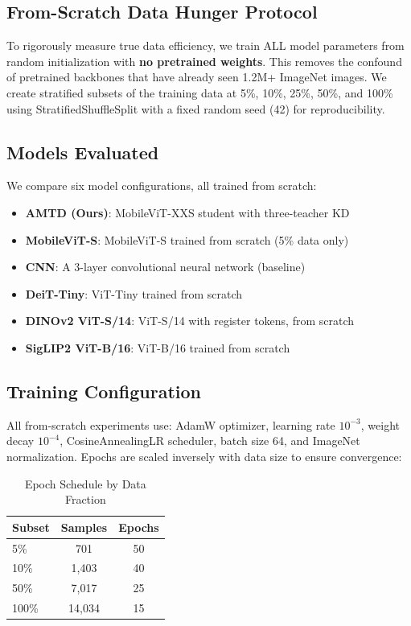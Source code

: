 \documentclass[journal]{IEEEtran}
\begin{document}
\subsection{From-Scratch Data Hunger Protocol}

To rigorously measure true data efficiency, we train ALL model parameters from random
initialization with \textbf{no pretrained weights}. This removes the confound of
pretrained backbones that have already seen 1.2M+ ImageNet images. We create stratified
subsets of the training data at 5\%, 10\%, 25\%, 50\%, and 100\% using StratifiedShuffleSplit
with a fixed random seed (42) for reproducibility.

\subsection{Models Evaluated}

We compare six model configurations, all trained from scratch:

\begin{itemize}
    \item \textbf{AMTD (Ours)}: MobileViT-XXS student with three-teacher KD
    \item \textbf{MobileViT-S}: MobileViT-S trained from scratch (5\% data only)
    \item \textbf{CNN}: A 3-layer convolutional neural network (baseline)
    \item \textbf{DeiT-Tiny}: ViT-Tiny trained from scratch
    \item \textbf{DINOv2 ViT-S/14}: ViT-S/14 with register tokens, from scratch
    \item \textbf{SigLIP2 ViT-B/16}: ViT-B/16 trained from scratch
\end{itemize}

\subsection{Training Configuration}

All from-scratch experiments use: AdamW optimizer, learning rate $10^{-3}$, weight decay
$10^{-4}$, CosineAnnealingLR scheduler, batch size 64, and ImageNet normalization.
Epochs are scaled inversely with data size to ensure convergence:

\begin{table}[!t]
\renewcommand{\arraystretch}{1.2}
\caption{Epoch Schedule by Data Fraction}
\label{tab:epochs}
\centering
\begin{tabular}{lcc}
\toprule
\textbf{Subset} & \textbf{Samples} & \textbf{Epochs} \\
\midrule
5\%    & 701   & 50  \\
10\%   & 1,403 & 40  \\
50\%   & 7,017 & 25  \\
100\%  & 14,034 & 15 \\
\bottomrule
\end{tabular}
\end{table}
\end{document}
